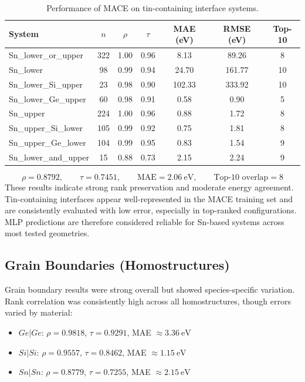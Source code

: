 \begin{table}[H]
\centering
\begin{tabular}{lcccccc}
\toprule
               System &  $n$ &  $\rho$ &  $\tau$ &  MAE (eV) &  RMSE (eV) &  Top-10 \\
\midrule
 Sn\_lower\_or\_upper &  322 &    1.00 &    0.96 &      8.13 &      89.26 &       8 \\
            Sn\_lower &   98 &    0.99 &    0.94 &     24.70 &     161.77 &      10 \\
 Sn\_lower\_Si\_upper &   23 &    0.98 &    0.90 &    102.33 &     333.92 &      10 \\
 Sn\_lower\_Ge\_upper &   60 &    0.98 &    0.91 &      0.58 &       0.90 &       5 \\
            Sn\_upper &  224 &    1.00 &    0.96 &      0.88 &       1.72 &       8 \\
 Sn\_upper\_Si\_lower &  105 &    0.99 &    0.92 &      0.75 &       1.81 &       8 \\
 Sn\_upper\_Ge\_lower &  104 &    0.99 &    0.95 &      0.83 &       1.54 &       9 \\
Sn\_lower\_and\_upper &   15 &    0.88 &    0.73 &      2.15 &       2.24 &       9 \\
\bottomrule
\end{tabular}
\caption{Performance of MACE on tin-containing interface systems.}
\label{tab:tin_systems}
\end{table}

\begin{equation}
    \rho = 0.8792, \qquad \tau = 0.7451, \qquad \text{MAE} = 2.06~\text{eV}, \qquad \text{Top-10 overlap} = 8
\end{equation}
These results indicate strong rank preservation and moderate energy agreement.
Tin-containing interfaces appear well-represented in the MACE training set and are consistently evaluated with low error, especially in top-ranked configurations.
MLP predictions are therefore considered reliable for Sn-based systems across most tested geometries.

\newpage \subsection*{Grain Boundaries (Homostructures)}

Grain boundary results were strong overall but showed species-specific variation.
Rank correlation was consistently high across all homostructures, though errors varied by material:
\begin{itemize}
  \item $Ge|Ge$: $\rho = 0.9818$, $\tau = 0.9291$, MAE $\approx 3.36\ \text{eV}$
  \item $Si|Si$: $\rho = 0.9557$, $\tau = 0.8462$, MAE $\approx 1.15\ \text{eV}$
  \item $Sn|Sn$: $\rho = 0.8779$, $\tau = 0.7255$, MAE $\approx 2.15\ \text{eV}$
\end{itemize}


